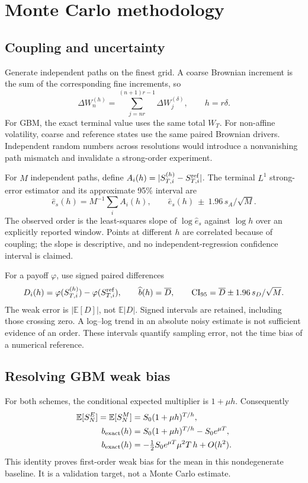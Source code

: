\documentclass[11pt,a4paper]{article}
\begin{document}
\newpage
\section{Monte Carlo methodology}
\subsection{Coupling and uncertainty}
Generate independent paths on the finest grid. A coarse Brownian increment is the sum of the corresponding fine increments, so
\begin{equation}
\Delta W_n^{(h)}=\sum_{j=nr}^{(n+1)r-1}\Delta W_j^{(\delta)},
\qquad h=r\delta.
\label{eq:coupling}
\end{equation}
For GBM, the exact terminal value uses the same total $W_T$.
For non-affine volatility, coarse and reference states use the same paired Brownian drivers. Independent random numbers across resolutions would introduce a nonvanishing path mismatch and invalidate a strong-order experiment.

For $M$ independent paths, define $A_i(h)=|S_{T,i}^{(h)}-S_{T,i}^{\rm ref}|$.
The terminal $L^1$ strong-error estimator and its approximate 95\% interval are
\begin{equation}
\widehat e_s(h)=M^{-1}\sum_i A_i(h),\qquad
\widehat e_s(h)\ \pm\ 1.96\,s_A/\sqrt M.
\end{equation}
The observed order is the least-squares slope of $\log\widehat e_s$ against $\log h$ over an explicitly reported window. Points at different $h$ are correlated because of coupling; the slope is descriptive, and no independent-regression confidence interval is claimed.

For a payoff $\varphi$, use signed paired differences
\begin{equation}
D_i(h)=\varphi(S_{T,i}^{(h)})-\varphi(S_{T,i}^{\rm ref}),\qquad
\widehat b(h)=\overline D,\qquad
{\rm CI}_{95}=\overline D\pm1.96\,s_D/\sqrt M.
\end{equation}
The weak error is $|\mathbb E[D]|$, not $\mathbb E|D|$. Signed intervals are retained, including those crossing zero. A log--log trend in an absolute noisy estimate is not sufficient evidence of an order. These intervals quantify sampling error, not the time bias of a numerical reference.

\subsection{Resolving GBM weak bias}
For both schemes, the conditional expected multiplier is $1+\mu h$. Consequently
\begin{align}
\mathbb E[S_N^{E}]=\mathbb E[S_N^{M}]&=S_0(1+\mu h)^{T/h},\\
b_{\rm exact}(h)&=S_0(1+\mu h)^{T/h}-S_0e^{\mu T},\label{eq:weak}\\
b_{\rm exact}(h)&=-\tfrac12 S_0e^{\mu T}\mu^2T\,h+O(h^2).
\end{align}
This identity proves first-order weak bias for the mean in this nondegenerate baseline. It is a validation target, not a Monte Carlo estimate.
\end{document}
